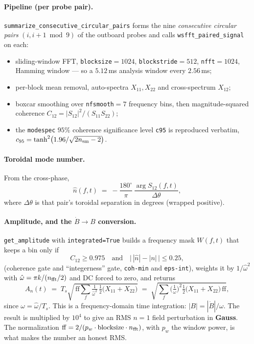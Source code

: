 \documentclass[11pt,a4paper]{article}
\newcommand{\code}[1]{\texttt{\small #1}}
\begin{document}
\paragraph{Pipeline (per probe pair).} \code{summarize\_consecutive\_circular\_pairs} forms the nine
\emph{consecutive circular pairs} $(i,i{+}1 \bmod 9)$ of the outboard probes and calls
\code{wsfft\_paired\_signal} on each:

\begin{itemize}[leftmargin=2em]
\item sliding-window FFT, \code{blocksize}$=1024$, \code{blockstride}$=512$, \code{nfft}$=1024$,
Hamming window --- so a $5.12$\,ms analysis window every $2.56$\,ms;
\item per-block mean removal, auto-spectra $X_{11},X_{22}$ and cross-spectrum $X_{12}$;
\item boxcar smoothing over \code{nfsmooth}$=7$ frequency bins, then magnitude-squared coherence
$C_{12} = |S_{12}|^2/(S_{11}S_{22})$;
\item the \code{modespec} $95\%$ coherence significance level \code{c95} is reproduced verbatim,
$c_{95}=\tanh^2\!\big(1.96/\sqrt{2n_{\rm sm}-2}\big)$.
\end{itemize}

\paragraph{Toroidal mode number.} From the cross-phase,
\begin{equation}
\hat n(f,t) \;=\; -\frac{180^\circ}{\pi}\,\frac{\arg S_{12}(f,t)}{\Delta\theta},
\end{equation}
where $\Delta\theta$ is that pair's toroidal separation in degrees (wrapped positive).

\paragraph{Amplitude, and the $\dot B \to B$ conversion.} \code{get\_amplitude} with
\code{integrated=True} builds a frequency mask $W(f,t)$ that keeps a bin only if
\begin{equation}
C_{12} \ge 0.975 \quad\text{and}\quad \big|\,|\hat n| - |n|\,\big| \le 0.25 ,
\end{equation}
(coherence gate and ``integerness'' gate, \code{coh-min} and \code{eps-int}), weights it by
$1/\hat\omega^2$ with $\hat\omega = \pi k / (n_{\rm fft}/2)$ and DC forced to zero, and returns
\begin{equation}
A_n(t) \;=\; T_s\sqrt{\,\mathrm{ff}\sum_f \tfrac{1}{\hat\omega^2}\,\tfrac{1}{2}\big(X_{11}+X_{22}\big)}
\;=\; \sqrt{\sum_f \Big(\tfrac{1}{\omega}\Big)^{\!2} \tfrac{1}{2}\big(X_{11}+X_{22}\big)\,\mathrm{ff}},
\end{equation}
since $\omega = \hat\omega/T_s$. This is a frequency-domain time integration: $|B| = |\dot B|/\omega$.
The result is multiplied by $10^{4}$ to give an RMS $n=1$ field perturbation in \textbf{Gauss}.
The normalization $\mathrm{ff} = 2/(p_w \cdot \text{blocksize} \cdot n_{\rm fft})$, with
$p_w$ the window power, is what makes the number an honest RMS.
\end{document}

